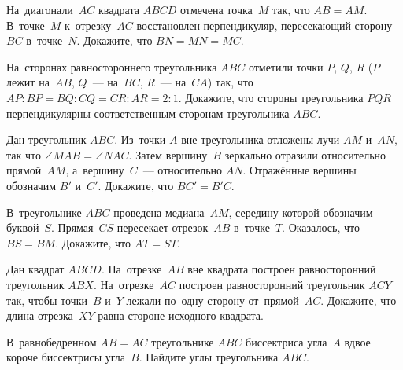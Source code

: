 \begin{problems}

\item
На~диагонали~$AC$ квадрата $ABCD$ отмечена точка~$M$ так, что $AB = AM$.
В~точке~$M$ к~отрезку~$AC$ восстановлен перпендикуляр, пересекающий
сторону~$BC$ в~точке~$N$.
Докажите, что $BN = MN = MC$.

\item
На~сторонах равностороннего треугольника $ABC$ отметили точки $P$, $Q$, $R$
($P$ лежит на~$AB$, $Q$~--- на~$BC$, $R$~--- на~$CA$) так, что
$AP : BP = BQ : CQ = CR : AR = 2 : 1$.
Докажите, что стороны треугольника $PQR$ перпендикулярны соответственным
сторонам треугольника $ABC$.

\item
Дан треугольник $ABC$.
Из~точки $A$ вне треугольника отложены лучи $AM$ и~$AN$, так что
$\angle MAB = \angle NAC$.
Затем вершину~$B$ зеркально отразили относительно прямой~$AM$,
а~вершину~$C$~--- относительно $AN$.
Отражённые вершины обозначим $B'$ и~$C'$.
Докажите, что $BC' = B'C$.

\item
В~треугольнике $ABC$ проведена медиана~$AM$, середину которой обозначим
буквой~$S$.
Прямая~$CS$ пересекает отрезок~$AB$ в~точке~$T$.
Оказалось, что $BS = BM$.
Докажите, что $AT = ST$.

\item
Дан квадрат $ABCD$.
На~отрезке~$AB$ вне квадрата построен равносторонний треугольник $ABX$.
На~отрезке~$AC$ построен равносторонний треугольник $ACY$ так, чтобы
точки~$B$ и~$Y$ лежали по~одну сторону от~прямой~$AC$.
Докажите, что длина отрезка~$XY$ равна стороне исходного квадрата.

\item
В~равнобедренном $AB = AC$ треугольнике $ABC$ биссектриса угла~$A$ вдвое короче
биссектрисы угла~$B$.
Найдите углы треугольника $ABC$.

\end{problems}

